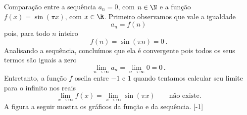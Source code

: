 \begin{example}
	Comparação entre a sequência $a_n=0$, com $n\in\N$ e a função
	$f(x)=\sin(\pi x)$, com $x\in\R$.
	\solution
	Primeiro observamos que vale a igualdade
	\[
    a_n = f(n)
	\]
	pois, para todo $n$ inteiro
	\[
    f(n) = \sin(\pi n) = 0   \,.
	\]
	Analisando a sequência, concluímos que ela é convergente pois todos
	os seus termos são iguais a zero
	\[
    \lim_{n\to \infty} a_n = \lim_{n\to \infty} 0 = 0  \,.
	\]
	Entretanto, a função $f$ oscila entre $-1$ e $1$ quando tentamos calcular
	seu limite para o infinito nos reais
	\[
  	\lim_{x\to\infty} f(x) = \lim_{x\to\infty} \sin(\pi x) \qquad \text{não existe.}
	\]
  A figura a seguir mostra os gráficos da função e da sequência.
  [-1]
\end{example}

